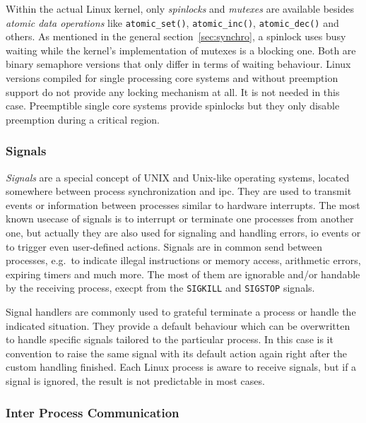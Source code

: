 Within the actual Linux kernel, only \textit{spinlocks} and \textit{mutexes} are available besides \textit{atomic data operations} like \texttt{atomic\_set()}, \texttt{atomic\_inc()}, \texttt{atomic\_dec()} and others\cite{achilles2006betriebssysteme}.
As mentioned in the general section~\ref{sec:synchro}, a spinlock uses busy waiting while the kernel's implementation of mutexes is a blocking one.
Both are binary semaphore versions that only differ in terms of waiting behaviour\cite{linux-locking}.
Linux versions compiled for single processing core systems and without preemption support do not provide any locking mechanism at all.
It is not needed in this case.
Preemptible single core systems provide spinlocks but they only disable preemption during a critical region\cite{linux-locking}.

\subsubsection*{Signals}
\textit{Signals} are a special concept of UNIX and Unix-like operating systems, located somewhere between process synchronization and \ac{ipc}.
They are used to transmit events or information between processes similar to hardware interrupts\cite{glatz2015betriebssysteme}.
The most known usecase of signals is to interrupt or terminate one processes from another one, but actually they are also used for signaling and handling errors, \ac{io} events or to trigger even user-defined actions\cite{achilles2006betriebssysteme}.
Signals are in common send between processes, e.g.\ to indicate illegal instructions or memory access, arithmetic errors, expiring timers and much more.
The most of them are ignorable and/or handable by the receiving process, execpt from the \texttt{SIGKILL} and \texttt{SIGSTOP} signals\cite{achilles2006betriebssysteme}.

Signal handlers are commonly used to grateful terminate a process or handle the indicated situation.
They provide a default behaviour which can be overwritten to handle specific signals tailored to the particular process.
In this case is it convention to raise the same signal with its default action again right after the custom handling finished\cite{achilles2006betriebssysteme}.
Each Linux process is aware to receive signals, but if a signal is ignored, the result is not predictable in most cases. 

\subsubsection*{Inter Process Communication}
